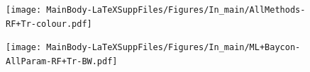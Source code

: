 \documentclass[12pt,letterpaper]{article}
\begin{document}
\newpage
\begin{figure}[!htbp]
\centering
    \texttt{[image: MainBody-LaTeXSuppFiles/Figures/In\_main/AllMethods-RF+Tr-colour.pdf]}
\caption{ }
\end{figure}

\newpage
\begin{figure}[!htbp]
\centering
    \texttt{[image: MainBody-LaTeXSuppFiles/Figures/In\_main/ML+Baycon-AllParam-RF+Tr-BW.pdf]}
\caption{ }
\end{figure}
\end{document}
